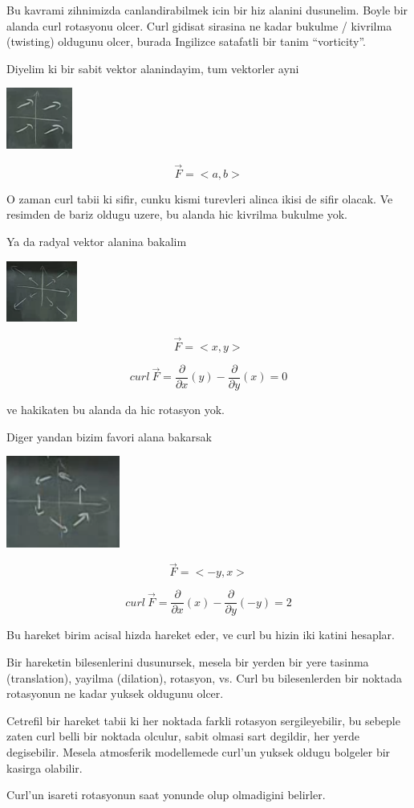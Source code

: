 \documentclass[12pt,fleqn]{article}
\begin{document}
Bu kavrami zihnimizda canlandirabilmek icin bir hiz alanini
dusunelim. Boyle bir alanda curl rotasyonu olcer. Curl gidisat sirasina ne
kadar bukulme /  kivrilma (twisting) oldugunu olcer, burada Ingilizce satafatli bir
tanim ``vorticity''. 

Diyelim ki bir sabit vektor alanindayim, tum vektorler ayni

\includegraphics[height=2cm]{21_5.png}

\[ \vec{F} = <a,b> \]

O zaman curl tabii ki sifir, cunku kismi turevleri alinca ikisi de sifir
olacak. Ve resimden de bariz oldugu uzere, bu alanda hic kivrilma bukulme
yok. 

Ya da radyal vektor alanina bakalim

\includegraphics[height=2cm]{21_6.png}

\[ \vec{F}= <x,y> \]

\[ curl \ \vec{F} = \frac{\partial }{\partial x}(y) -
 \frac{\partial }{\partial y}(x) = 0
 \]

ve hakikaten bu alanda da hic rotasyon yok. 

Diger yandan bizim favori alana bakarsak

\includegraphics[height=3cm]{21_1.png}

\[ \vec{F} = <-y,x> \]

\[ curl \ \vec{F} = \frac{\partial }{\partial x}(x) -
 \frac{\partial }{\partial y}(-y) = 2
 \]

Bu hareket birim acisal hizda hareket eder, ve curl bu hizin iki katini
hesaplar. 

Bir hareketin bilesenlerini dusunursek, mesela bir yerden bir yere tasinma
(translation), yayilma (dilation), rotasyon, vs. Curl bu bilesenlerden
bir noktada rotasyonun ne kadar yuksek oldugunu olcer. 

Cetrefil bir hareket tabii ki her noktada farkli rotasyon sergileyebilir,
bu sebeple zaten curl belli bir noktada olculur, sabit olmasi sart
degildir, her yerde degisebilir. Mesela atmosferik modellemede curl'un
yuksek oldugu bolgeler bir kasirga olabilir. 

Curl'un isareti rotasyonun saat yonunde olup olmadigini belirler. 
\end{document}
